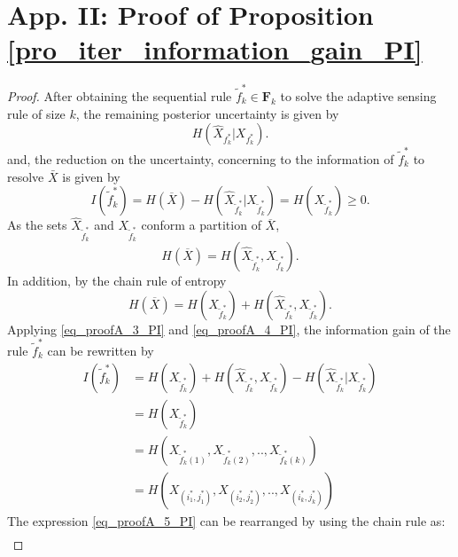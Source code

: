 \section{App. II: Proof of Proposition \ref{pro_iter_information_gain_PI}}
\label{proof_pro_iter_information_gain_PI}
\begin{proof}

After obtaining the sequential  rule $\tilde{f}^*_k \in \mathbf{F}_k$ to solve the adaptive sensing rule of size $k$, the remaining posterior uncertainty is given by
\begin{equation}\label{eq_proofA_1_PI}
	H(\hat{X}_{f^*_k}| {X}_{f^*_k}).
\end{equation}
and, the reduction on the uncertainty, concerning to the information of $\tilde{f}^*_k$ to resolve $\bar{X}$ is given by
\begin{equation}\label{eq_proofA_2_PI}
	I(\tilde{f}^*_k) = H(\overline{X}) - H(\hat{X}_{\tilde{f}^*_k}| {X}_{\tilde{f}^*_k}) = H({X}_{\tilde{f}^*_k}) \geq 0. 
\end{equation}
As the sets $\hat{X}_{\tilde{f}^*_k} $ and $ {X}_{\tilde{f}^*_k} $ conform a partition of $\overline{X}$,
\begin{equation}\label{eq_proofA_3_PI}
	H(\overline{X}) = H(\hat{X}_{\tilde{f}^*_k} , {X}_{\tilde{f}^*_k}).
\end{equation}
In addition, by the chain rule of entropy
\begin{equation}\label{eq_proofA_4_PI}
	H(\overline{X}) =  H( {X}_{\tilde{f}^*_k}) + H(\hat{X}_{\tilde{f}^*_k} , {X}_{\tilde{f}^*_k}).
\end{equation}
Applying \eqref{eq_proofA_3_PI} and \eqref{eq_proofA_4_PI}, the information gain of the rule $\tilde{f}^*_k$ can be rewritten by
\begin{align}\label{eq_proofA_5_PI}
	I(\tilde{f}^*_k) &= H( {X}_{\tilde{f}^*_k}) + H(\hat{X}_{\tilde{f}^*_k} , {X}_{\tilde{f}^*_k})  - H(\hat{X}_{\tilde{f}^*_k}| {X}_{\tilde{f}^*_k}) \nonumber \\
		&= H( {X}_{\tilde{f}^*_k}) \nonumber \\
 		&= H( {X}_{\tilde{f}^*_k(1)}, {X}_{\tilde{f}^*_k(2)}, .. , {X}_{\tilde{f}^*_k(k)}) \nonumber \\
		&= H( {X}_{(i_{1}^{*},j_{1}^{*})} ,  {X}_{(i_{2}^{*},j_{2}^{*})} , .. ,  {X}_{(i_{k}^{*},j_{k}^{*})}   ) 
\end{align}
The expression \eqref{eq_proofA_5_PI} can be rearranged by using the chain rule as:
\begin{align}\label{eq_proofA_6_PI}

\end{align}
\end{proof}
